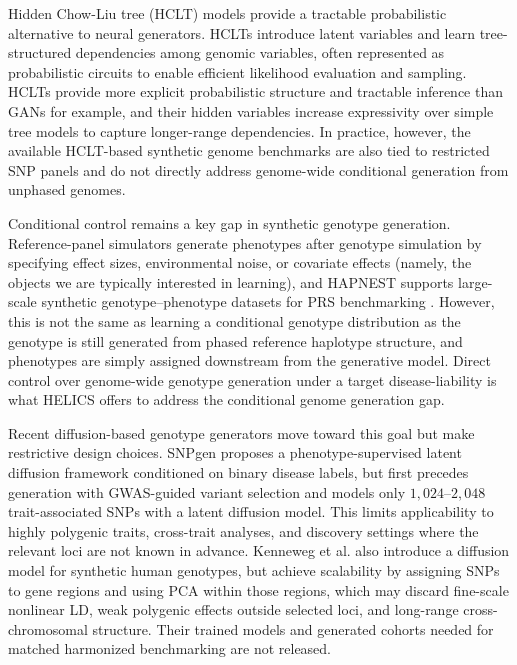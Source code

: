 \documentclass{article}
\begin{document}
Hidden Chow-Liu tree (HCLT) models \cite{dang2023HCLTs} provide a tractable probabilistic alternative to neural generators. HCLTs introduce latent variables and learn tree-structured dependencies among genomic variables, often represented as probabilistic circuits to enable efficient likelihood evaluation and sampling. HCLTs provide more explicit probabilistic structure and tractable inference than GANs for example, and their hidden variables increase expressivity over simple tree models to capture longer-range dependencies. In practice, however, the available HCLT-based synthetic genome benchmarks are also tied to restricted SNP panels and do not directly address genome-wide conditional generation from unphased genomes.

Conditional control remains a key gap in synthetic genotype generation. Reference-panel simulators generate phenotypes after genotype simulation by specifying effect sizes, environmental noise, or covariate effects (namely, the objects we are typically interested in learning), and HAPNEST supports large-scale synthetic genotype--phenotype datasets for PRS benchmarking \cite{wharrie2023hapnest}. However, this is not the same as learning a conditional genotype distribution as the genotype is still generated from phased reference haplotype structure, and phenotypes are simply assigned downstream from the generative model. Direct control over genome-wide genotype generation under a target disease-liability is what HELICS offers to address the conditional genome generation gap.

Recent diffusion-based genotype generators move toward this goal but make restrictive design choices. SNPgen \cite{lampis2026snpgen} proposes a phenotype-supervised latent diffusion framework conditioned on binary disease labels, but first precedes generation with GWAS-guided variant selection and models only \(1{,}024\)--\(2{,}048\) trait-associated SNPs with a latent diffusion model. This limits applicability to highly polygenic traits, cross-trait analyses, and discovery settings where the relevant loci are not known in advance. Kenneweg et al. \cite{kenneweg2025generating} also introduce a diffusion model for synthetic human genotypes, but achieve scalability by assigning SNPs to gene regions and using PCA within those regions, which may discard fine-scale nonlinear LD, weak polygenic effects outside selected loci, and long-range cross-chromosomal structure. Their trained models and generated cohorts needed for matched harmonized benchmarking are not released. 
\end{document}
